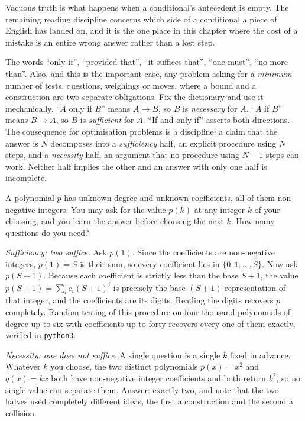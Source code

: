 Vacuous truth is what happens when a conditional's antecedent is empty. The remaining reading discipline concerns which side of a conditional a piece of English has landed on, and it is the one place in this chapter where the cost of a mistake is an entire wrong answer rather than a lost step.

\cue The words ``only if'', ``provided that'', ``it suffices that'', ``one must'', ``no more than''. Also, and this is the important case, any problem asking for a \emph{minimum} number of tests, questions, weighings or moves, where a bound and a construction are two separate obligations.
\method Fix the dictionary and use it mechanically. ``$A$ only if $B$'' means $A\to B$, so $B$ is \emph{necessary} for $A$. ``$A$ if $B$'' means $B\to A$, so $B$ is \emph{sufficient} for $A$. ``If and only if'' asserts both directions. The consequence for optimisation problems is a discipline: a claim that the answer is $N$ decomposes into a \emph{sufficiency} half, an explicit procedure using $N$ steps, and a \emph{necessity} half, an argument that no procedure using $N-1$ steps can work. Neither half implies the other and an answer with only one half is incomplete.

\begin{worked}
A polynomial $p$ has unknown degree and unknown coefficients, all of them non-negative integers. You may ask for the value $p(k)$ at any integer $k$ of your choosing, and you learn the answer before choosing the next $k$. How many questions do you need?

\emph{Sufficiency: two suffice.} Ask $p(1)$. Since the coefficients are non-negative integers, $p(1)=S$ is their sum, so every coefficient lies in $\{0,1,\ldots,S\}$. Now ask $p(S+1)$. Because each coefficient is strictly less than the base $S+1$, the value $p(S+1)=\sum_i c_i(S+1)^i$ is precisely the base-$(S+1)$ representation of that integer, and the coefficients are its digits. Reading the digits recovers $p$ completely. Random testing of this procedure on four thousand polynomials of degree up to six with coefficients up to forty recovers every one of them exactly, verified in \texttt{python3}.

\emph{Necessity: one does not suffice.} A single question is a single $k$ fixed in advance. Whatever $k$ you choose, the two distinct polynomials $p(x)=x^2$ and $q(x)=kx$ both have non-negative integer coefficients and both return $k^2$, so no single value can separate them. Answer: exactly two, and note that the two halves used completely different ideas, the first a construction and the second a collision.
\end{worked}

